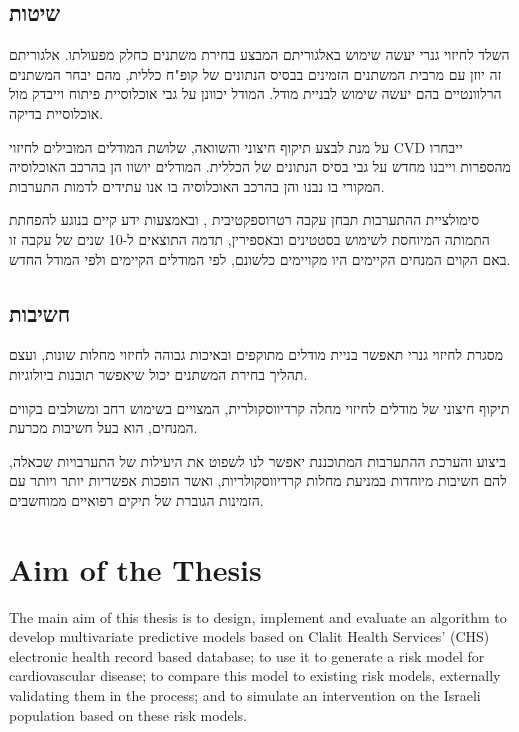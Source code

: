 \documentclass[a4paper,12pt]{article}
\begin{document}
\begin{hebrew}
		\subsection*{שיטות}
				השלד לחיזוי גנרי יעשה שימוש באלגוריתם המבצע בחירת משתנים כחלק מפעולתו. אלגוריתם זה יוזן עם מרבית המשתנים הזמינים בבסיס הנתונים של קופ"ח כללית, מהם יבחר המשתנים הרלוונטיים בהם יעשה שימוש לבניית מודל. המודל יכוונן על גבי אוכלוסיית פיתוח וייבדק מול אוכלוסיית בדיקה.
		
		על מנת לבצע תיקוף חיצוני והשוואה, שלושת המודלים המובילים לחיזוי CVD ייבחרו מהספרות וייבנו מחדש על גבי בסיס הנתונים של הכללית. המודלים יושוו הן בהרכב האוכלוסיה המקורי בו נבנו והן בהרכב האוכלוסיה בו אנו עתידים לדמות התערבות.
		
		סימולציית ההתערבות תבחן עקבה רטרוספקטיבית , ובאמצעות ידע קיים בנוגע להפחתת התמותה המיוחסת לשימוש בסטטינים ובאספירין, תדמה התוצאים ל-10 שנים  של עקבה זו  באם הקוים המנחים הקיימים היו מקויימים כלשונם, לפי המודלים הקיימים ולפי המודל החדש.
		
		
		\subsection*{חשיבות}
		מסגרת לחיזוי גנרי תאפשר בניית מודלים מתוקפים ובאיכות גבוהה לחיזוי מחלות שונות, ועצם תהליך בחירת המשתנים יכול שיאפשר תובנות ביולוגיות.
		
		תיקוף חיצוני של מודלים לחיזוי מחלה קרדיווסקולרית, המצויים בשימוש רחב ומשולבים בקווים המנחים, הוא בעל חשיבות מכרעת\cite{Collins2015}.
		
			ביצוע והערכת ההתערבות המתוכננת יאפשר לנו לשפוט את היעילות של התערבויות שכאלה, להם חשיבות מיוחדות במניעת מחלות קרדיווסקולריות\cite{Riegel2017}, ואשר הופכות אפשריות יותר ויותר עם הזמינות הגוברת של תיקים רפואיים ממוחשבים.
		
	\end{hebrew}
	
	\section{Aim of the Thesis}
	The main aim of this thesis is to design, implement and evaluate an algorithm to develop multivariate predictive models based on Clalit Health Services' (CHS) electronic health record based database; to use it to generate a risk model for cardiovascular disease; to compare this model to existing risk models, externally validating them in the process; and to simulate an intervention on the Israeli population based on these risk models.
	
\end{document}
